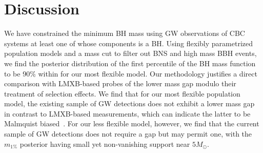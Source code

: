 \documentclass[modern]{aastex631}
\begin{document}

%








\section{Discussion}
\label{sec:discussion}
We have constrained the minimum BH mass using GW observations of CBC systems at least one of whose components is a BH. Using flexibly parametrized population models and a mass cut to filter out BNS and high mass BBH events, we find the posterior distribution of the first percentile of the BH mass function to be 90\% within \monepctplgplpincludingnewunits for our most flexible model. Our methodology justifies a direct comparison with LMXB-based probes of the lower mass gap modulo their treatment of selection effects. We find that for our most flexible population model, the existing sample of GW detections does not exhibit a lower mass gap in contrast to LMXB-based measurements, which can indicate the latter to be Malmquist biased~\citep{Siegel:2022gwc}. For our less flexible model, however, we find that the current sample of GW detections does not require a gap but may permit one, with the $m_{1\%}$ posterior having small yet non-vanishing support near $5M_{\odot}$.
\end{document}
